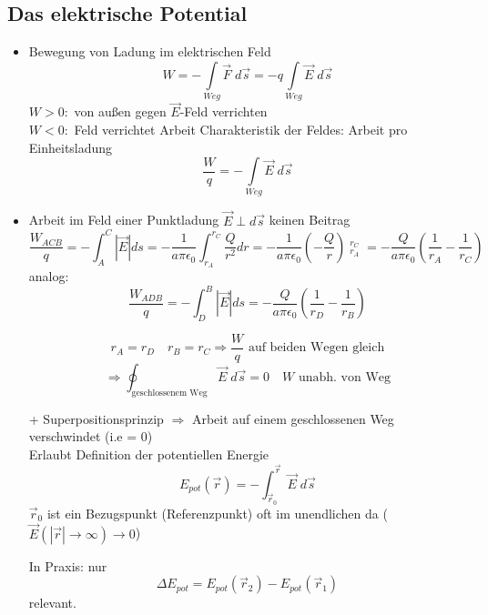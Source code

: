 \documentclass[titlepage,12pt,a4paper,ngerman]{report}
\begin{document}
\subsection{Das elektrische Potential}
\begin{itemize}
\item Bewegung von Ladung im elektrischen Feld
$$ W = -\int\limits_{Weg} \vec{F} \; d\vec{s} = -q \int\limits_{Weg} \vec{E} \;d\vec{s}$$
$ W>0:$ von außen gegen $\vec{E}$-Feld verrichten\\
$ W<0:$ Feld verrichtet Arbeit
Charakteristik der Feldes: Arbeit pro Einheitsladung
$$\frac{W}{q} = -\int\limits_{Weg} \vec{E}\;d\vec{s}$$
\item Arbeit im Feld einer Punktladung
$ \vec{E} \perp d\vec{s}$ keinen Beitrag
$$ \frac{W_{ACB}}{q} = -\int_{A}^C |\vec{E}| ds = -\dfrac{1}{a\pi\epsilon_0} \int_{r_A}^{r_C} \frac{Q}{r^2} dr =  -\dfrac{1}{a\pi\epsilon_0} (-\frac{Q}{r}) \mathop{\bigg|}_{r_A}^{r_C} =  -\dfrac{Q}{a\pi\epsilon_0} ( \frac{1}{r_A} - \frac{1}{r_C})$$
analog:
$$\frac{W_{ADB}}{q} = -\int_D^B |\vec{E}| ds =  -\dfrac{Q}{a\pi\epsilon_0} ( \frac{1}{r_D} - \frac{1}{r_B})$$

$$r_A = r_D \quad r_B = r_C \Rightarrow \frac{W}{q} \textrm{ auf beiden Wegen gleich}$$
$$\Rightarrow \oint_{\textrm{geschlossenem Weg}} \vec{E}\; d\vec{s} = 0 \quad W \textrm{ unabh. von Weg}$$

+ Superpositionsprinzip $\Rightarrow$ Arbeit auf einem geschlossenen Weg verschwindet (i.e = 0)\\
Erlaubt Definition der potentiellen Energie
$$ E_{pot} (\vec{r}) = -\int_{\vec{r}_0}^{\vec{r}} \vec{E} \; d\vec{s} $$
$\vec{r}_0$ ist ein Bezugspunkt (Referenzpunkt) oft im unendlichen da ($\vec{E}( |\vec{r}| \rightarrow \infty) \rightarrow 0$)

In Praxis: nur
$$ \Delta E_{pot} = E_{pot}(\vec{r}_2) - E_{pot}(\vec{r}_1)$$
relevant.


\end{itemize}
\end{document}
